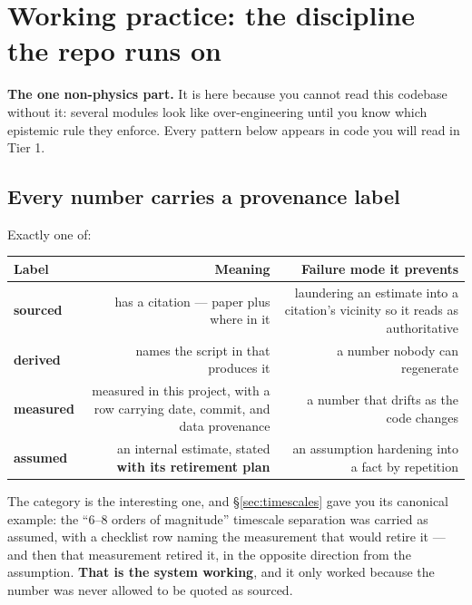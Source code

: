\section{Working practice: the discipline the repo runs on}
\label{part:practice}

\textbf{The one non-physics part.} It is here because you cannot read this
codebase without it: several modules look like over-engineering until you know
which epistemic rule they enforce. Every pattern below appears in code you will
read in Tier 1.

\subsection{Every number carries a provenance label}
\label{sec:provenance}

Exactly one of:

\begin{center}
\small
\begin{tabularx}{\textwidth}{@{}l R{0.875} R{1.125}@{}}
\toprule
\textbf{Label} & \textbf{Meaning} &
\textbf{Failure mode it prevents} \\
\midrule
\textbf{sourced} & has a citation --- paper plus where in it &
  laundering an estimate into a citation's vicinity so it reads as
  authoritative \\
\textbf{derived} & names the script in  that produces it &
  a number nobody can regenerate \\
\textbf{measured} &
  measured in this project, with a  row carrying date, commit,
  and data provenance &
  a number that drifts as the code changes \\
\textbf{assumed} &
  an internal estimate, stated \textbf{with its retirement plan} &
  an assumption hardening into a fact by repetition \\
\bottomrule
\end{tabularx}
\end{center}

The  category is the interesting one, and \S\ref{sec:timescales}
gave you its canonical example: the ``6--8 orders of magnitude'' timescale
separation was carried as assumed, with a checklist row naming the measurement
that would retire it --- and then that measurement retired it, in the opposite
direction from the assumption. \textbf{That is the system working}, and it only
worked because the number was never allowed to be quoted as sourced.

